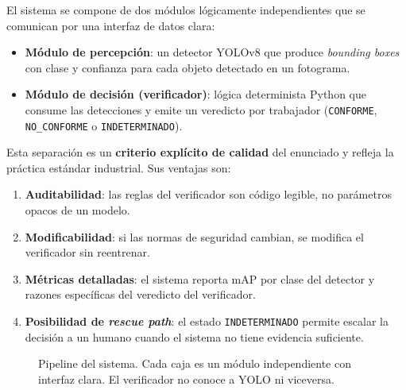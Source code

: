 \documentclass[11pt,a4paper]{article}
\begin{document}
El sistema se compone de dos módulos lógicamente independientes que se
comunican por una interfaz de datos clara:

\begin{itemize}[leftmargin=*]
    \item \textbf{Módulo de percepción}: un detector YOLOv8 que produce
    \textit{bounding boxes} con clase y confianza para cada objeto
    detectado en un fotograma.
    \item \textbf{Módulo de decisión (verificador)}: lógica determinista
    Python que consume las detecciones y emite un veredicto por
    trabajador (\texttt{CONFORME}, \texttt{NO\_CONFORME} o
    \texttt{INDETERMINADO}).
\end{itemize}

Esta separación es un \textbf{criterio explícito de calidad} del
enunciado y refleja la práctica estándar industrial. Sus ventajas son:

\begin{enumerate}[leftmargin=*]
    \item \textbf{Auditabilidad}: las reglas del verificador son código
    legible, no parámetros opacos de un modelo.
    \item \textbf{Modificabilidad}: si las normas de seguridad cambian,
    se modifica el verificador sin reentrenar.
    \item \textbf{Métricas detalladas}: el sistema reporta mAP por
    clase del detector y razones específicas del veredicto del
    verificador.
    \item \textbf{Posibilidad de \textit{rescue path}}: el estado
    \texttt{INDETERMINADO} permite escalar la decisión a un humano
    cuando el sistema no tiene evidencia suficiente.
\end{enumerate}

\begin{figure}[H]
    \centering
    \footnotesize\ttfamily
    \caption{Pipeline del sistema. Cada caja es un módulo independiente
    con interfaz clara. El verificador no conoce a YOLO ni viceversa.}
    \label{fig:arquitectura}
\end{figure}
\end{document}
